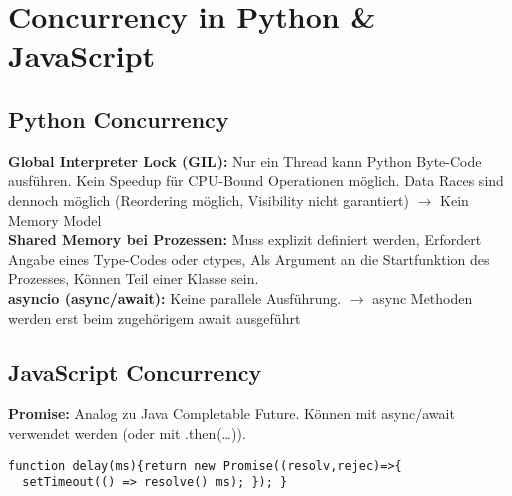 
\section{Concurrency in Python \& JavaScript}
\subsection{Python Concurrency}
\textcolor{b}{\textbf{Global Interpreter Lock (GIL):}} Nur ein Thread kann Python Byte-Code ausführen. Kein Speedup für CPU-Bound Operationen möglich. Data Races sind dennoch möglich (Reordering möglich, Visibility nicht garantiert) $\rightarrow$ Kein Memory Model\\
\textcolor{b}{\textbf{Shared Memory bei Prozessen:}} Muss explizit definiert werden, Erfordert Angabe eines Type-Codes oder ctypes, Als Argument an die Startfunktion des Prozesses, Können Teil einer Klasse sein.\\
\textcolor{b}{\textbf{asyncio (async/await):}} Keine parallele Ausführung. $\rightarrow$ async Methoden werden erst beim zugehörigem await ausgeführt
\subsection{JavaScript Concurrency}
\textcolor{b}{\textbf{Promise:}} Analog zu Java Completable Future. Können mit async/await verwendet werden (oder mit .then(\ldots)).
\begin{lstlisting}
function delay(ms){return new Promise((resolv,rejec)=>{
  setTimeout(() => resolve() ms); }); }
\end{lstlisting}